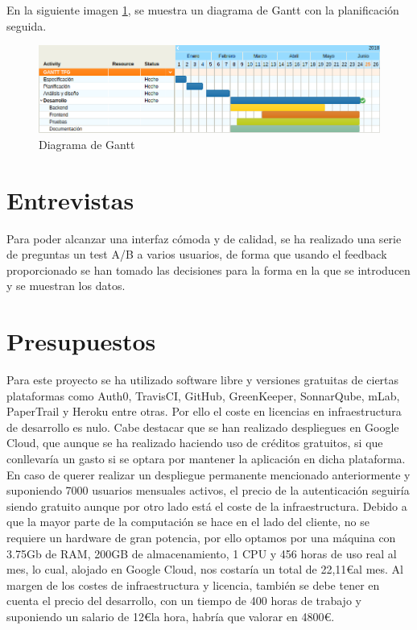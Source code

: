 En la siguiente imagen \ref{fig:gantt}, se muestra un diagrama de Gantt con la planificación seguida.

\begin{figure}
  \begin{center}
    \includegraphics[width=\textwidth]{imagenes/gantt.png}
    \caption{Diagrama de Gantt}
    \label{fig:gantt}
  \end{center}
\end{figure}



\section {Entrevistas}
Para poder alcanzar una interfaz cómoda y de calidad, se ha realizado una serie de preguntas un \gls{test A/B} a varios usuarios, de forma que usando el feedback proporcionado se han tomado las decisiones para la forma en la que se introducen y se muestran los datos.

\section {Presupuestos}

Para este proyecto se ha utilizado software libre y versiones gratuitas de ciertas plataformas como Auth0, TravisCI, GitHub, GreenKeeper, SonnarQube, mLab, PaperTrail y Heroku entre otras. Por ello el coste en licencias en infraestructura de desarrollo es nulo. Cabe destacar que se han realizado despliegues en Google Cloud, que aunque se ha realizado haciendo uso de créditos gratuitos, si que conllevaría un gasto si se optara por mantener la aplicación en dicha plataforma.
En caso de querer realizar un despliegue permanente mencionado anteriormente y  suponiendo 7000 usuarios mensuales activos, el precio de la autenticación seguiría siendo gratuito aunque
por otro lado está el coste de la infraestructura. Debido a que la mayor parte de la computación
se hace en el lado del cliente, no se requiere un hardware de gran potencia, por ello optamos por
una máquina con 3.75Gb de RAM, 200GB de almacenamiento, 1 CPU y 456 horas de uso real al mes, lo cual, alojado en Google Cloud, nos costaría un total de 22,11\euro  al mes. Al margen de los costes de infraestructura y licencia, también se debe tener en cuenta el precio del desarrollo, con un tiempo  de 400 horas de trabajo y suponiendo un salario de 12\euro  la hora, habría que valorar en 4800\euro .
